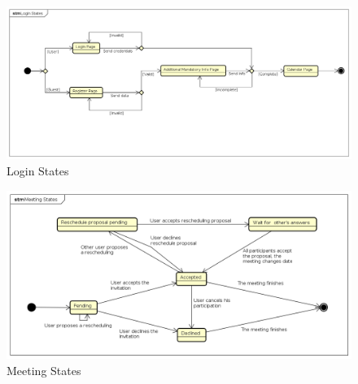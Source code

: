 \begin{figure}[H]
	\centering\includegraphics[width=\textwidth]{Images/StateCharts/LoginStates.png}
	\caption{Login States}
\end{figure}

\begin{figure}[H]
	\centering\includegraphics[width=\textwidth]{Images/StateCharts/MeetingStates.png}
	\caption{Meeting States}
\end{figure}
